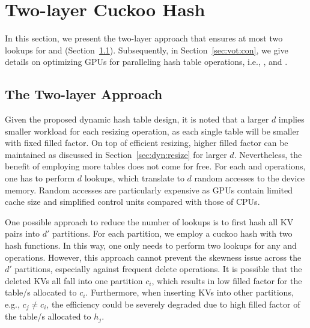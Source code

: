 


\section{Two-layer Cuckoo Hash}\label{sec:vot}
In this section, we present the two-layer approach that ensures at most two lookups for  and  (Section~\ref{sec:vot:two}). 
Subsequently, in Section~\ref{sec:vot:con}, we give details on optimizing GPUs for paralleling hash table operations, i.e., ,  and .



\subsection{The Two-layer Approach}\label{sec:vot:two}
Given the proposed dynamic hash table design, it is noted that a larger $d$ implies smaller workload for each resizing operation, as each single table will be smaller with fixed filled factor. On top of efficient resizing, higher filled factor can be maintained as discussed in Section~\ref{sec:dyn:resize} for larger $d$. Nevertheless, the benefit of employing more tables does not come for free. For each  and  operations, one has to perform $d$ lookups, which translate to $d$ random accesses to the device memory. 
Random accesses are particularly expensive as GPUs contain limited cache size and simplified control units compared with those of CPUs.

One possible approach to reduce the number of lookups is to first hash all KV pairs into $d'$ partitions. For each partition, we employ a cuckoo hash with two hash functions. In this way, one only needs to perform two lookups for any  and  operations. However, this approach cannot prevent the skewness issue across the $d'$ partitions, especially against frequent delete operations. It is possible that the deleted KVs all fall into one partition $c_i$, which results in low filled factor for the table/s allocated to $c_i$. Furthermore, when inserting KVs into other partitions, e.g., $c_j \neq c_i$, the efficiency could be severely degraded due to high filled factor of the table/s allocated to $h_j$. 

